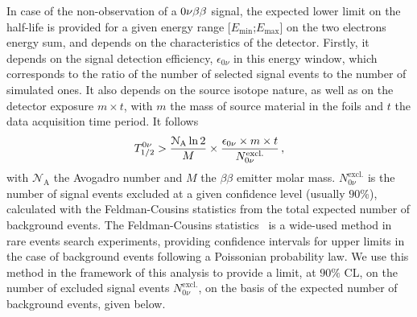In case of the non-observation of a $0\nu\beta\beta$ signal, the expected lower limit on the half-life is provided for a given energy range [$E_{\text{min}}$;$E_{\text{max}}$] on the two electrons energy sum, and depends on the characteristics of the detector.
Firstly, it depends on the signal detection efficiency, $\epsilon_{0\nu}$ in this energy window, which corresponds to the ratio of the number of selected signal events to the number of simulated ones.
It also depends on the source isotope nature, as well as on the detector exposure $m\times t$, with $m$ the mass of source material in the foils and $t$ the data acquisition time period.
It follows
\begin{equation}
  T_{1/2}^{0\nu} > \frac{\mathcal{N}_{\text{A}}\ln{2}}{M}\times \frac{\epsilon_{0\nu}\times m\times t}{N_{0\nu}^{\text{excl.}}}\,,
  \label{eq:tbeta_limit}
\end{equation}
with $\mathcal{N}_{\text{A}}$ the Avogadro number and $M$ the $\beta\beta$ emitter molar mass.
$N_{0\nu}^{\text{excl.}}$ is the number of signal events excluded at a given confidence level (usually $90$\%), calculated with the Feldman-Cousins statistics from the total expected number of background events.
The Feldman-Cousins statistics~\cite{art:feld-cous} is a wide-used method in rare events search experiments, providing confidence intervals for upper limits in the case of background events following a Poissonian probability law.
We use this method in the framework of this analysis to provide a limit, at $90\%$ CL, on the number of excluded signal events $N_{0\nu}^{\text{excl.}}$, on the basis of the expected number of background events, given below.
